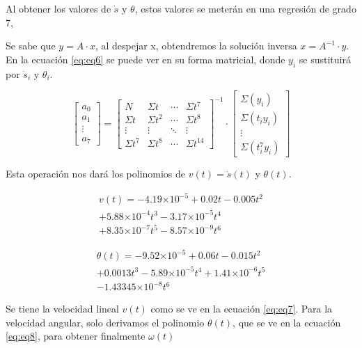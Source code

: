 \documentclass[spanish,10pt,letterpaper, twocolumn]{article}
\providecommand{\e}[1]{\ensuremath{\times 10^{#1}}}
\begin{document}
Al obtener los valores de $\dot{s}$ y $\theta$, estos valores se meter\'an en una regresi\'on de grado 7, 

Se sabe que $y=A \cdot x$, al despejar x, obtendremos la soluci\'on inversa $x=A^{-1} \cdot y$. En la ecuaci\'on \eqref{eq:eq6} se puede ver en su forma matricial, donde $y_i$ se sustituir\'a por $\dot{s}_i$ y $\theta_i$. 

\begin{equation}
\label{eq:eq6}
\begin{bmatrix}
	a_0 \\
	a_1 \\
	\vdots \\
	a_7
\end{bmatrix}
	=
\begin{bmatrix}
	N & \Sigma t  & \cdots & \Sigma t^7\\
	\Sigma t & \Sigma t^2  & \cdots & \Sigma t^8\\
	\vdots & \vdots & \ddots & \vdots \\
	\Sigma t^7 & \Sigma t^8 & \cdots & \Sigma t^{14}
\end{bmatrix} ^{-1}
\cdot
\begin{bmatrix}
	\Sigma(y_i)\\
	\Sigma(t_iy_i)\\
	\vdots \\
	\Sigma(t_i^7y_i)
\end{bmatrix}
\end{equation}

Esta operaci\'on nos dar\'a los polinomios de $v(t)=\dot{s}(t)$ y $\theta(t)$.

\begin{equation}
	\label{eq:eq7}
	\begin{matrix}
	v(t)=-4.19\e{-5}+0.02t-0.005t^2\\
	+5.88\e{-4}t^3-3.17\e{-5}t^4\\
	+8.35\e{-7}
t^5-8.57\e{-9}t^6
	\end{matrix}
\end{equation}

\begin{equation}
	\label{eq:eq8}
	\begin{matrix}
	\theta(t)=-9.52\e{-5}+0.06t-0.015t^2\\
	+0.0013t^3-5.89\e{-5}t^4+1.41\e{-6}t^5\\
	-1.43345\e{-8}t^6
	\end{matrix}
\end{equation}

Se tiene la velocidad lineal $v(t)$ como se ve en la ecuaci\'on \eqref{eq:eq7}. Para la velocidad angular, solo derivamos el polinomio $\theta(t)$, que se ve en la ecuaci\'on \eqref{eq:eq8}, para obtener finalmente $\omega (t)$ 
 
\end{document}
